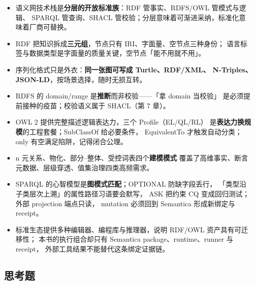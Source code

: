 \begin{itemize}
  \item 语义网技术栈是\textbf{分层的开放标准族}：RDF 管事实、RDFS/OWL 管模式与逻辑、
        SPARQL 管查询、SHACL 管校验；分层意味着可渐进采纳，标准化意味着厂商可替换。
  \item RDF 把知识拆成\textbf{三元组}，节点只有 IRI、字面量、空节点三种身份；
        语言标签与数据类型是字面量的质量关键，空节点「能不用就不用」。
  \item 序列化格式只是外衣：\textbf{同一张图可写成 Turtle、RDF/XML、
        N-Triples、JSON-LD}，按场景选择，随时无损互转。
  \item RDFS 的 domain/range 是\textbf{推断}而非校验——「拿 domain 当校验」
        是必须提前接种的疫苗；校验语义属于 SHACL（第 7 章）。
  \item OWL 2 提供完整描述逻辑表达力，三个 Profile（EL/QL/RL）
        是\textbf{表达力换规模}的工程套餐；SubClassOf 给必要条件，
        EquivalentTo 才触发自动分类；only 有空满足陷阱，记得闭合公理。
  \item n 元关系、物化、部分--整体、受控词表四个\textbf{建模模式}
        覆盖了高维事实、断言元数据、层级穿透、值集治理四类高频需求。
  \item SPARQL 的心智模型是\textbf{图模式匹配}；OPTIONAL 防缺字段丢行，
        「类型沿子类层次上溯」的属性路径习语要会默写，
        ASK 把约束 CQ 变成回归测试；外部 projection 端点只读，
        mutation 必须回到 Semantica 形成新绑定与 receipt。
  \item 标准生态提供多种编辑器、编程库与推理器，说明 RDF/OWL 资产具有可迁移性；
        本书的执行组合却只有 Semantica package、runtime、runner 与 receipt，
        外部工具结果不能替代这条绑定证据链。
\end{itemize}

\subsection{思考题}

